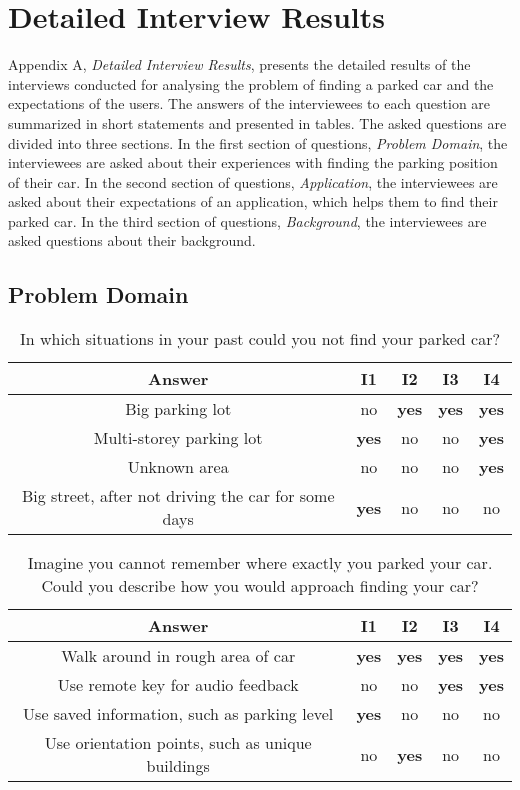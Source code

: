 \chapter{Detailed Interview Results}
Appendix A, \textit{Detailed Interview Results}, presents the detailed results of the interviews conducted for analysing the problem of finding a parked car and the expectations of the users. The answers of the interviewees to each question are summarized in short statements and presented in tables. The asked questions are divided into three sections.
In the first section of questions, \textit{Problem Domain}, the interviewees are asked about their experiences with finding the parking position of their car.
In the second section of questions, \textit{Application}, the interviewees are asked about their expectations of an application, which helps them to find their parked car.
In the third section of questions, \textit{Background}, the interviewees are asked questions about their background.

\section{Problem Domain}

\newcommand{\yes}{\textbf{\cellcolor{lightgray!60}yes}}
\newcommand{\no}{no}
\begin{table}
    \begin{tabular}{|c|c c c c|} 
        \toprule
        Answer & I1 & I2 & I3 & I4 \\
        \midrule
        Big parking lot & \no & \yes & \yes & \yes\\
        Multi-storey parking lot & \yes & \no & \no &\yes \\
        Unknown area & \no & \no & \no & \yes\\
        Big street, after not driving the car for some days & \yes & \no & \no & \no\\
        \bottomrule 
    \end{tabular}
    \caption{In which situations in your past could you not find your parked car?}
    \label{table:a:1}
\end{table}

\begin{table}
    \begin{tabular}{|c|c c c c|} 
        \toprule
        Answer & I1 & I2 & I3 & I4 \\
        \midrule
        Walk around in rough area of car & \yes & \yes & \yes & \yes \\
        Use remote key for audio feedback & \no & \no & \yes & \yes\\
        Use saved information, such as parking level & \yes & \no & \no & \no \\
        Use orientation points, such as unique buildings & \no & \yes & \no & \no \\
        \toprule
    \end{tabular}
    \caption{Imagine you cannot remember where exactly you parked your car. Could you describe how you would approach finding your car?}
    \label{table:a:1}
\end{table}


